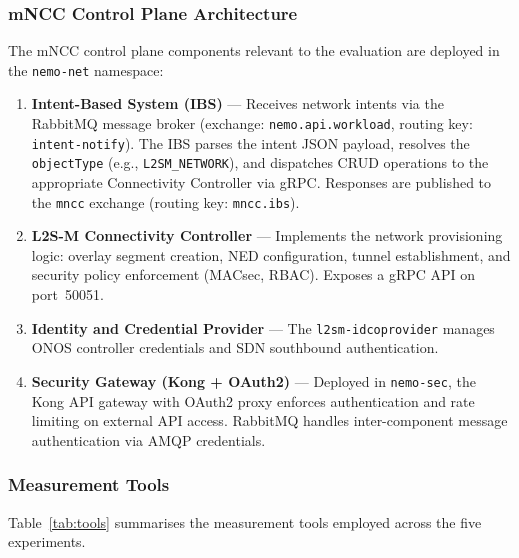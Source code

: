 \subsubsection{mNCC Control Plane Architecture}
\label{subsubsec:mncc_controlplane}

The mNCC control plane components relevant to the evaluation are
deployed in the \texttt{nemo-net} namespace:

\begin{enumerate}
  \item \textbf{Intent-Based System (IBS)} ---
    Receives network intents via the RabbitMQ message broker
    (exchange: \texttt{nemo.api.workload}, routing key:
    \texttt{intent-notify}).
    The IBS parses the intent JSON payload, resolves the
    \texttt{objectType} (e.g., \texttt{L2SM\_NETWORK}), and
    dispatches CRUD operations to the appropriate Connectivity
    Controller via gRPC.
    Responses are published to the \texttt{mncc} exchange
    (routing key: \texttt{mncc.ibs}).

  \item \textbf{L2S-M Connectivity Controller} ---
    Implements the network provisioning logic: overlay segment
    creation, NED configuration, tunnel establishment, and
    security policy enforcement (MACsec, RBAC).
    Exposes a gRPC API on port~50051.

  \item \textbf{Identity and Credential Provider} ---
    The \texttt{l2sm-idcoprovider} manages ONOS controller
    credentials and SDN southbound authentication.

  \item \textbf{Security Gateway (Kong + OAuth2)} ---
    Deployed in \texttt{nemo-sec}, the Kong API gateway with
    OAuth2 proxy enforces authentication and rate limiting on
    external API access.
    RabbitMQ handles inter-component message authentication via
    AMQP credentials.
\end{enumerate}

\subsubsection{Measurement Tools}
\label{subsubsec:tools}

Table~\ref{tab:tools} summarises the measurement tools employed
across the five experiments.

